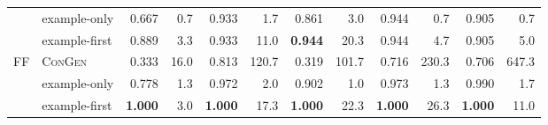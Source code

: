 \begin{tabular}{llrrrrrrrrrr}
 & example-only & 0.667 & 0.7 & 0.933 & 1.7 & 0.861 & 3.0 & 0.944 & 0.7 & 0.905 & 0.7 \\
 & example-first & 0.889 & 3.3 & 0.933 & 11.0 & \textbf{0.944} & 20.3 & 0.944 & 4.7 & 0.905 & 5.0 \\
\midrule
\multirow{3}{*}{FF} & \textsc{ConGen} & 0.333 & 16.0 & 0.813 & 120.7 & 0.319 & 101.7 & 0.716 & 230.3 & 0.706 & 647.3 \\
 & example-only & 0.778 & 1.3 & 0.972 & 2.0 & 0.902 & 1.0 & 0.973 & 1.3 & 0.990 & 1.7 \\
 & example-first & \textbf{1.000} & 3.0 & \textbf{1.000} & 17.3 & \textbf{1.000} & 22.3 & \textbf{1.000} & 26.3 & \textbf{1.000} & 11.0 \\
\bottomrule
\end{tabular}
